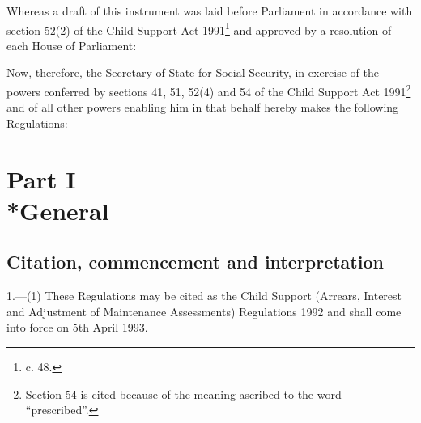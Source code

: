 \documentclass[12pt,a4paper]{article}
\title{\regstitle}
\author{S.I. 1992 No. 1816}
\date{Made 20th July 1992\\Coming into force 5th April 1993}
\begin{document}
\maketitle

\noindent
 Whereas a draft of this instrument was laid before Parliament in accordance with section 52(2) of the Child Support Act 1991\footnote{ c. 48.} and approved by a resolution of each House of Parliament:

Now, therefore, the Secretary of State for Social Security, in exercise of the powers conferred by sections 41, 51, 52(4) and 54 of the Child Support Act 1991\footnote{\frenchspacing Section 54 is cited because of the meaning ascribed to the word “prescribed”.} and of all other powers enabling him in that behalf hereby makes the following Regulations: 

{\sloppy

\tableofcontents

}

\setcounter{secnumdepth}{-2}

\section[Part I --- General]{Part I\\*General}

\renewcommand\parthead{--- Part I}

\subsection[1. Citation, commencement and interpretation]{Citation, commencement and interpretation}

1.—(1) These Regulations may be cited as the Child Support (Arrears, Interest and Adjustment of Maintenance Assessments) Regulations 1992 and shall come into force on 5th April 1993.
\end{document}
